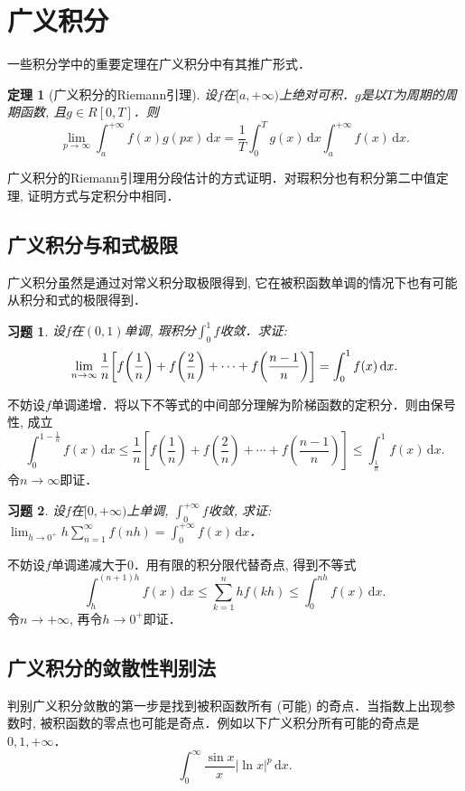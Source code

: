 \documentclass[11pt,a4paper]{ctexart}
\makeatletter
\theoremstyle{thmseries} %
\newtheorem{thm}{定理}[section]
\theoremstyle{exerseries}
\newtheorem{exer}{习题}[section]
\renewenvironment{proof}[1][\proofname]{\par
  \pushQED{\qed}%
  \normalfont \topsep6\p@\@plus6\p@\relax
  \trivlist
  \item[\hskip\labelsep
        \itshape
    #1\@addpunct{}]\ignorespaces
}{%
  \popQED\endtrivlist\@endpefalse
}
\newenvironment{pf}{\begin{proof}[\bfseries\upshape 证\quad]}{\end{proof}}
\newcommand{\bra}[1]{\mathopen{}\left(#1\right)}
\newcommand{\sbra}[1]{\mathopen{}\left[#1\right]}
\renewcommand{\d}{\mathrm{d}}
\def \nti {\mathnormal{n}\to\infty}
\def \series {\sum_{n=1}^{\infty}}
\makeatother
\begin{document}
\section{广义积分}
一些积分学中的重要定理在广义积分中有其推广形式．
\begin{thm}[广义积分的Riemann引理]
	设$f$在$[a,+\infty)$上绝对可积．$g$是以$T$为周期的周期函数, 且$g\in R[0,T]$．则
	\[\lim_{p\to\infty}\int_{a}^{+\infty}f(x)g(px)\,\d x=\frac{1}{T}\int_{0}^{T}g(x)\,\d x\int_{a}^{+\infty}f(x)\,\d x.\]
\end{thm}

广义积分的Riemann引理用分段估计的方式证明．对瑕积分也有积分第二中值定理, 证明方式与定积分中相同．


\subsection{广义积分与和式极限}
广义积分虽然是通过对常义积分取极限得到, 它在被积函数单调的情况下也有可能从积分和式的极限得到．
\begin{exer}
	设$f$在$(0,1)$单调, 瑕积分$\int_{0}^{1}f$收敛．求证: 
	\[\lim_{\nti}\frac{1}{n}\sbra{f\bra{\frac{1}{n}}+f\bra{\frac{2}{n}}+\cdots+f\bra{\frac{n-1}{n}}}=\int_{0}^{1}f(x)\,\d x.\]
\end{exer}
\begin{pf}
	不妨设$f$单调递增．将以下不等式的中间部分理解为阶梯函数的定积分．则由保号性, 成立
	\[\int_{0}^{1-\frac{1}{n}}f(x)\,\d x\leq\frac{1}{n}\sbra{f\bra{\frac{1}{n}}+f\bra{\frac{2}{n}}+\cdots+f\bra{\frac{n-1}{n}}}\leq\int_{\frac{1}{n}}^{1}f(x)\,\d x.\]
	令$n\to\infty$即证．
\end{pf}

\begin{exer}
	设$f$在$[0,+\infty)$上单调, $\int_{0}^{+\infty}f$收敛, 求证: $\lim_{h\to0^+}h\series f(nh)=\int_{0}^{+\infty}f(x)\,\d x$．
\end{exer}
\begin{pf}
	不妨设$f$单调递减大于$0$．用有限的积分限代替奇点, 得到不等式
	\[\int_{h}^{(n+1)h}f(x)\,\d x\leq\sum_{k=1}^{n}hf(kh)\leq\int_{0}^{nh}f(x)\,\d x.\]
	令$n\to+\infty$, 再令$h\to0^+$即证．
\end{pf}


\subsection{广义积分的敛散性判别法}
判别广义积分敛散的第一步是找到被积函数所有 (可能) 的奇点．当指数上出现参数时, 被积函数的零点也可能是奇点．例如以下广义积分所有可能的奇点是$0,1,+\infty$．
\[\int_{0}^{\infty}\frac{\sin x}{x}|\ln x|^p\,\d x.\]
\end{document}
